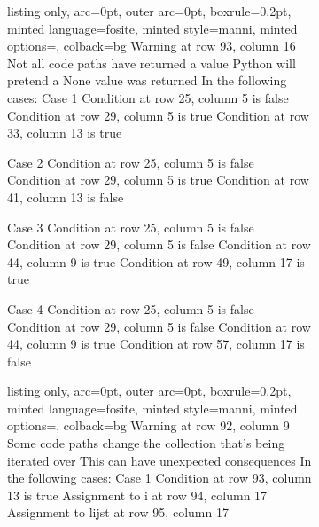 \clearpage
\begin{figure}[h]
\ContinuedFloat %

\begin{subfigure}{\textwidth}
\begin{tcblisting}{listing only, 
    arc=0pt,
    outer arc=0pt, 
    boxrule=0.2pt,
    minted language=fosite,
    minted style=manni,
    minted options={},
    colback=bg }
Warning at row 93, column 16
  Not all code paths have returned a value
  Python will pretend a None value was returned
  In the following cases:
  Case 1
    Condition at row 25, column 5 is false
    Condition at row 29, column 5 is true
    Condition at row 33, column 13 is true

  Case 2
    Condition at row 25, column 5 is false
    Condition at row 29, column 5 is true
    Condition at row 41, column 13 is false

  Case 3
    Condition at row 25, column 5 is false
    Condition at row 29, column 5 is false
    Condition at row 44, column 9 is true
    Condition at row 49, column 17 is true

  Case 4
    Condition at row 25, column 5 is false
    Condition at row 29, column 5 is false
    Condition at row 44, column 9 is true
    Condition at row 57, column 17 is false


\end{tcblisting}
\end{subfigure}
\begin{subfigure}{\textwidth}
\begin{tcblisting}{listing only, 
    arc=0pt,
    outer arc=0pt, 
    boxrule=0.2pt,
    minted language=fosite,
    minted style=manni,
    minted options={},
    colback=bg }
Warning at row 92, column 9
  Some code paths change the collection that's being iterated over
  This can have unexpected consequences
  In the following cases:
  Case 1
    Condition at row 93, column 13 is true
    Assignment to i at row 94, column 17
    Assignment to lijst at row 95, column 17

\end{tcblisting}
\end{subfigure}
\end{figure}

